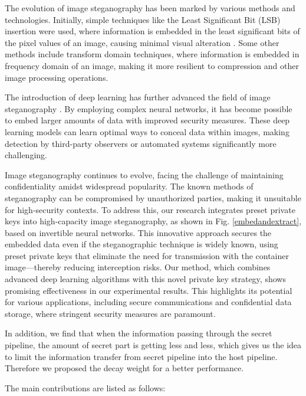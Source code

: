 \documentclass{article}
\begin{document}
The evolution of image steganography has been marked by various methods and technologies. Initially, simple techniques \cite{luo2010edge,chan2004hiding} like the Least Significant Bit (LSB) insertion were used, where information is embedded in the least significant bits of the pixel values of an image, causing minimal visual alteration \cite{kadhim2019comprehensive}. Some other methods \cite{barni2001improved,hsu1999hidden} include transform domain techniques, where information is embedded in frequency domain of an image, making it more resilient to compression and other image processing operations.

The introduction of deep learning has further advanced the field of image steganography \cite{lu2021large,zhang2020udh,baluja2019hiding,duan2019reversible,duan2020high,duan2020highx}. By employing complex neural networks, it has become possible to embed larger amounts of data with improved security measures. These deep learning models can learn optimal ways to conceal data within images, making detection by third-party observers or automated systems significantly more challenging.

Image steganography continues to evolve, facing the challenge of maintaining confidentiality amidst widespread popularity. The known methods of steganography can be compromised by unauthorized parties, making it unsuitable for high-security contexts. To address this, our research integrates preset private keys into high-capacity image steganography, as shown in Fig. \ref{embedandextract}, based on invertible neural networks. This innovative approach secures the embedded data even if the steganographic technique is widely known, using preset private keys that eliminate the need for transmission with the container image—thereby reducing interception risks. Our method, which combines advanced deep learning algorithms with this novel private key strategy, shows promising effectiveness in our experimental results. This highlights its potential for various applications, including secure communications and confidential data storage, where stringent security measures are paramount.

In addition, we find that when the information passing through the secret pipeline, the amount of secret part is getting less and less, which gives us the idea to limit the information transfer from secret pipeline into the host pipeline. Therefore we proposed the decay weight for a better performance.

The main contributions are listed as follows:
\end{document}
